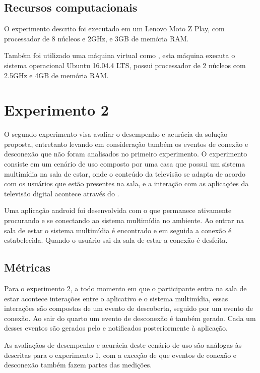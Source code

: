 \subsection{Recursos computacionais}

O experimento descrito foi executado em um \smartphone{} Lenovo Moto Z Play, com processador de 8 núcleos e 2GHz, e 3GB de memória RAM.

Também foi utilizado uma máquina virtual como \broker{} \mqtt{}, esta máquina executa o sistema operacional Ubuntu 16.04.4 LTS, possui processador de 2 núcleos com 2.5GHz e 4GB de memória RAM.

\section{Experimento 2}

O segundo experimento visa avaliar o desempenho e acurácia da solução proposta, entretanto levando em consideração também os eventos de conexão e desconexão que não foram analisados no primeiro experimento. O experimento consiste em um cenário de uso composto por uma casa que possui um sistema multimídia na sala de estar, onde o conteúdo da televisão se adapta de acordo com os usuários que estão presentes na sala, e a interação com as aplicações da televisão digital acontece através do \smartphone{}.

Uma aplicação android foi desenvolvida com o \middleware{} \mhubcddl{} que permanece ativamente procurando e se conectando ao sistema multimídia no ambiente. Ao entrar na sala de estar o sistema multimídia é encontrado e em seguida a conexão é estabelecida. Quando o usuário sai da sala de estar a conexão é desfeita. 

\subsection{Métricas}

Para o experimento 2, a todo momento em que o participante entra na sala de estar acontece interações entre o aplicativo e o sistema multimídia, essas interações são compostas de um evento de descoberta, seguido por um evento de conexão. Ao sair do quarto um evento de desconexão é também gerado. Cada um desses eventos são gerados pelo \stwopa{} e notificados posteriormente à aplicação.

As avaliaçãos de desempenho e acurácia deste cenário de uso são análogas às descritas para o experimento 1, com a exceção de que eventos de conexão e desconexão também fazem partes das medições.

